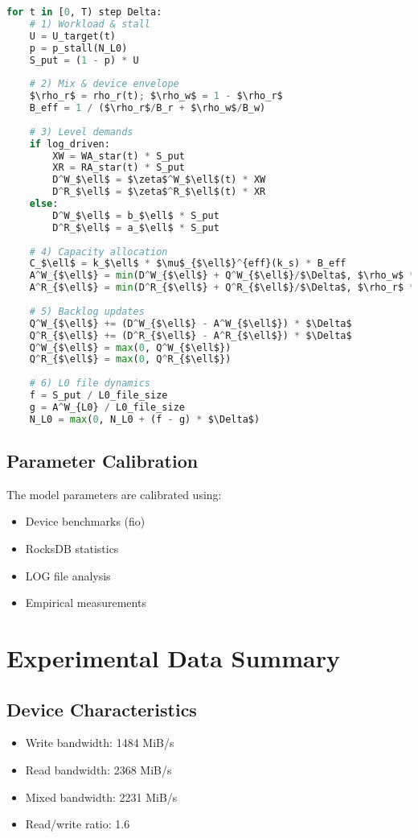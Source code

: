 \documentclass[11pt,twocolumn]{article}
\begin{document}
\begin{lstlisting}[language=Python]
for t in [0, T) step Delta:
    # 1) Workload & stall
    U = U_target(t)
    p = p_stall(N_L0)
    S_put = (1 - p) * U
    
    # 2) Mix & device envelope
    $\rho_r$ = rho_r(t); $\rho_w$ = 1 - $\rho_r$
    B_eff = 1 / ($\rho_r$/B_r + $\rho_w$/B_w)
    
    # 3) Level demands
    if log_driven:
        XW = WA_star(t) * S_put
        XR = RA_star(t) * S_put
        D^W_$\ell$ = $\zeta$^W_$\ell$(t) * XW
        D^R_$\ell$ = $\zeta$^R_$\ell$(t) * XR
    else:
        D^W_$\ell$ = b_$\ell$ * S_put
        D^R_$\ell$ = a_$\ell$ * S_put
    
    # 4) Capacity allocation
    C_$\ell$ = k_$\ell$ * $\mu$_{$\ell$}^{eff}(k_s) * B_eff
    A^W_{$\ell$} = min(D^W_{$\ell$} + Q^W_{$\ell$}/$\Delta$, $\rho_w$ * C_{$\ell$})
    A^R_{$\ell$} = min(D^R_{$\ell$} + Q^R_{$\ell$}/$\Delta$, $\rho_r$ * C_{$\ell$})
    
    # 5) Backlog updates
    Q^W_{$\ell$} += (D^W_{$\ell$} - A^W_{$\ell$}) * $\Delta$
    Q^R_{$\ell$} += (D^R_{$\ell$} - A^R_{$\ell$}) * $\Delta$
    Q^W_{$\ell$} = max(0, Q^W_{$\ell$})
    Q^R_{$\ell$} = max(0, Q^R_{$\ell$})
    
    # 6) L0 file dynamics
    f = S_put / L0_file_size
    g = A^W_{L0} / L0_file_size
    N_L0 = max(0, N_L0 + (f - g) * $\Delta$)
\end{lstlisting}

\subsection{Parameter Calibration}

The model parameters are calibrated using:
\begin{itemize}
    \item Device benchmarks (fio)
    \item RocksDB statistics
    \item LOG file analysis
    \item Empirical measurements
\end{itemize}

\section{Experimental Data Summary}

\subsection{Device Characteristics}
\begin{itemize}
    \item Write bandwidth: 1484 MiB/s
    \item Read bandwidth: 2368 MiB/s
    \item Mixed bandwidth: 2231 MiB/s
    \item Read/write ratio: 1.6
\end{itemize}
\end{document}
